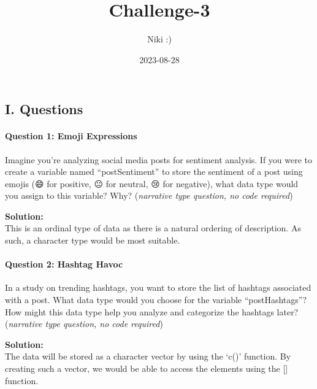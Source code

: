 \documentclass[
]{article}
\title{Challenge-3}
\author{Niki :)}
\date{2023-08-28}
\newenvironment{Shaded}{\begin{snugshade}}{\end{snugshade}}
\newcommand{\AttributeTok}[1]{\textcolor[rgb]{0.13,0.29,0.53}{#1}}
\newcommand{\ConstantTok}[1]{\textcolor[rgb]{0.56,0.35,0.01}{#1}}
\newcommand{\FunctionTok}[1]{\textcolor[rgb]{0.13,0.29,0.53}{\textbf{#1}}}
\newcommand{\NormalTok}[1]{#1}
\newcommand{\SpecialCharTok}[1]{\textcolor[rgb]{0.81,0.36,0.00}{\textbf{#1}}}
\begin{document}
\maketitle

\begin{Shaded}
\end{Shaded}

\hypertarget{i.-questions}{%
\subsection{I. Questions}\label{i.-questions}}

\hypertarget{question-1-emoji-expressions}{%
\paragraph{Question 1: Emoji
Expressions}\label{question-1-emoji-expressions}}

Imagine you're analyzing social media posts for sentiment analysis. If
you were to create a variable named ``postSentiment'' to store the
sentiment of a post using emojis (😄 for positive, 😐 for neutral, 😢
for negative), what data type would you assign to this variable? Why?
(\emph{narrative type question, no code required})

\textbf{Solution:}\\
This is an ordinal type of data as there is a natural ordering of
description. As such, a character type would be most suitable.

\hypertarget{question-2-hashtag-havoc}{%
\paragraph{Question 2: Hashtag Havoc}\label{question-2-hashtag-havoc}}

In a study on trending hashtags, you want to store the list of hashtags
associated with a post. What data type would you choose for the variable
``postHashtags''? How might this data type help you analyze and
categorize the hashtags later? (\emph{narrative type question, no code
required})

\textbf{Solution:}\\
The data will be stored as a character vector by using the `c()'
function. By creating such a vector, we would be able to access the
elements using the {[}{]} function.
\end{document}
